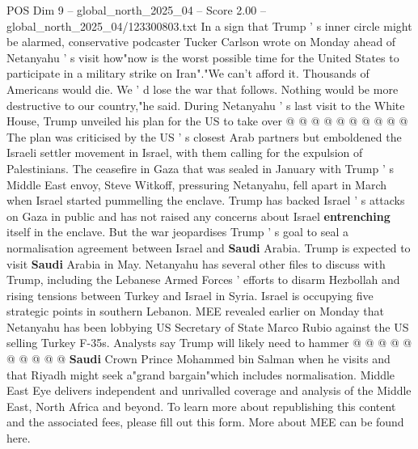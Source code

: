 \begin{textsample}{POS Dim 9 – global\_north\_2025\_04 – Score 2.00 – global\_north\_2025\_04/123300803.txt}
In a sign that Trump ' s inner circle might be alarmed, conservative podcaster Tucker Carlson wrote on Monday ahead of Netanyahu ' s visit how"now is the worst possible time for the United States to participate in a military strike on Iran"."We can't afford it.
Thousands of Americans would die.
We ' d lose the war that follows.
Nothing would be more destructive to our country,"he said.
During Netanyahu ' s last visit to the White House, Trump unveiled his plan for the US to take over @ @ @ @ @ @ @ @ @ @ The plan was criticised by the US ' s closest Arab partners but emboldened the Israeli settler movement in Israel, with them calling for the expulsion of Palestinians.
The ceasefire in Gaza that was sealed in January with Trump ' s Middle East envoy, Steve Witkoff, pressuring Netanyahu, fell apart in March when Israel started pummelling the enclave.
Trump has backed Israel ' s attacks on Gaza in public and has not raised any concerns about Israel \textbf{entrenching} itself in the enclave.
But the war jeopardises Trump ' s goal to seal a normalisation agreement between Israel and \textbf{Saudi} Arabia.
Trump is expected to visit \textbf{Saudi} Arabia in May.
Netanyahu has several other files to discuss with Trump, including the Lebanese Armed Forces ' efforts to disarm Hezbollah and rising tensions between Turkey and Israel in Syria.
Israel is occupying five strategic points in southern Lebanon.
MEE revealed earlier on Monday that Netanyahu has been lobbying US Secretary of State Marco Rubio against the US selling Turkey F-35s.
Analysts say Trump will likely need to hammer @ @ @ @ @ @ @ @ @ @ \textbf{Saudi} Crown Prince Mohammed bin Salman when he visits and that Riyadh might seek a"grand bargain"which includes normalisation.
Middle East Eye delivers independent and unrivalled coverage and analysis of the Middle East, North Africa and beyond.
To learn more about republishing this content and the associated fees, please fill out this form.
More about MEE can be found here.

\end{textsample}
